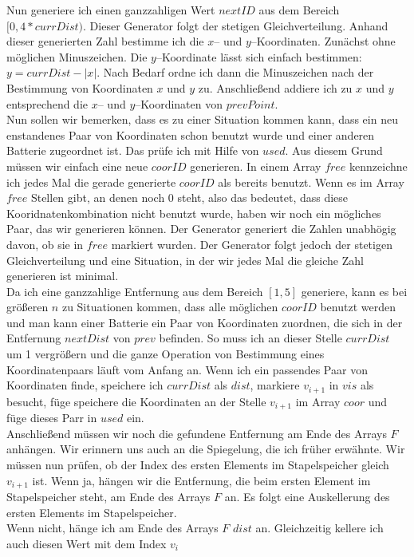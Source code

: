\documentclass[a4paper,10pt,ngerman]{scrartcl}
\begin{document}
Nun generiere ich einen ganzzahligen Wert $nextID$ aus dem Bereich $[0, 4*currDist)$.
Dieser Generator folgt der stetigen Gleichverteilung.
Anhand dieser generierten Zahl bestimme ich die $x$-- und $y$--Koordinaten.
Zunächst ohne möglichen Minuszeichen.
Die $y$--Koordinate lässt sich einfach bestimmen: $y = currDist - |x|$.
Nach Bedarf ordne ich dann die Minuszeichen nach der Bestimmung von Koordinaten $x$ und $y$ zu.
Anschließend addiere ich zu $x$ und $y$ entsprechend die $x$-- und $y$--Koordinaten von $prevPoint$.\\
Nun sollen wir bemerken, dass es zu einer Situation kommen kann, dass ein neu enstandenes Paar von Koordinaten 
schon benutzt wurde und einer anderen Batterie zugeordnet ist. Das prüfe ich mit Hilfe von $used$.
Aus diesem Grund müssen wir einfach eine neue $coorID$ generieren.
In einem Array $free$ kennzeichne ich jedes Mal die gerade generierte $coorID$ als bereits benutzt.
Wenn es im Array $free$ Stellen gibt, an denen noch 0 steht, also das bedeutet, dass diese Kooridnatenkombination nicht benutzt wurde, haben wir noch ein mögliches Paar, das wir generieren können.
Der Generator generiert die Zahlen unabhögig davon, ob sie in $free$ markiert wurden.
Der Generator folgt jedoch der stetigen Gleichverteilung und eine Situation, in der
wir jedes Mal die gleiche Zahl generieren ist minimal.\\
Da ich eine ganzzahlige Entfernung aus dem Bereich $[1,5]$ generiere, kann es bei größeren $n$ zu Situationen kommen, 
dass alle möglichen $coorID$ benutzt werden und man kann einer Batterie ein Paar von Koordinaten zuordnen, die sich
in der Entfernung $nextDist$ von $prev$ befinden. So muss ich an dieser Stelle $currDist$ um 1 vergrößern und die ganze
Operation von Bestimmung eines Koordinatenpaars läuft vom Anfang an. Wenn ich ein passendes Paar von Koordinaten finde,
speichere ich $currDist$ als $dist$, markiere $v_{i+1}$ in $vis$ als besucht, füge speichere die Koordinaten
an der Stelle $v_{i+1}$ im Array $coor$ und füge dieses Parr in $used$ ein.\\
Anschließend müssen wir noch die gefundene Entfernung am Ende des Arrays $F$ anhängen.
Wir erinnern uns auch an die Spiegelung, die ich früher erwähnte. Wir müssen nun prüfen, ob der Index
des ersten Elements im Stapelspeicher gleich $v_{i+1}$ ist.
Wenn ja, hängen wir die Entfernung, die beim ersten Element im Stapelspeicher steht, am Ende des Arrays $F$ an.
Es folgt eine Auskellerung des ersten Elements im Stapelspeicher.\\
Wenn nicht, hänge ich am Ende des Arrays $F$ $dist$ an. Gleichzeitig kellere ich auch diesen Wert mit dem Index $v_i$
\end{document}

